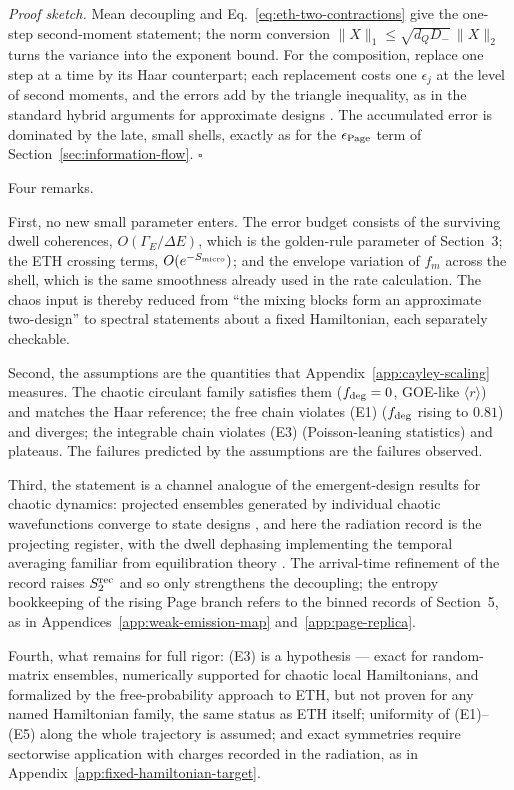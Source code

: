 \documentclass[12pt]{article}
\newcommand{\Smicro}{S_{\rm micro}}
\begin{document}
\emph{Proof sketch.}  Mean decoupling and
Eq.~\eqref{eq:eth-two-contractions} give the one-step second-moment
statement; the norm conversion
$\|X\|_1\le\sqrt{d_QD_-}\,\|X\|_2$ turns the variance into the exponent
bound.  For the composition, replace one step at a time by its Haar
counterpart; each replacement costs one $\epsilon_j$ at the level of second
moments, and the errors add by the triangle inequality, as in the standard
hybrid arguments for approximate designs
\cite{SzehrDupuisTomamichelRenner2013,HarrowLow2009}.  The accumulated error
is dominated by the late, small shells, exactly as for the
$\epsilon_{\rm Page}$ term of Section~\ref{sec:information-flow}.
\hfill$\square$

Four remarks.

First, no new small parameter enters.  The error budget consists of the
surviving dwell coherences, $O(\Gamma_E/\Delta E)$, which is the golden-rule
parameter of Section~3; the ETH crossing terms, $O(e^{-\Smicro})$; and the
envelope variation of $f_m$ across the shell, which is the same smoothness
already used in the rate calculation.  The chaos input is thereby reduced
from ``the mixing blocks form an approximate two-design'' to spectral
statements about a fixed Hamiltonian, each separately checkable.

Second, the assumptions are the quantities that
Appendix~\ref{app:cayley-scaling} measures.  The chaotic circulant family
satisfies them ($f_{\rm deg}=0$, GOE-like $\langle r\rangle$) and matches the
Haar reference; the free chain violates (E1) ($f_{\rm deg}$ rising to
$0.81$) and diverges; the integrable chain violates (E3) (Poisson-leaning
statistics) and plateaus.  The failures predicted by the assumptions are the
failures observed.

Third, the statement is a channel analogue of the emergent-design results
for chaotic dynamics: projected ensembles generated by individual chaotic
wavefunctions converge to state designs
\cite{HoChoi2022,CotlerMarkHuang2023}, and here the radiation record is the
projecting register, with the dwell dephasing implementing the temporal
averaging familiar from equilibration theory
\cite{LindenPopescuShortWinter2009}.  The arrival-time refinement of the
record raises $S_2^{\rm rec}$ and so only strengthens the decoupling; the
entropy bookkeeping of the rising Page branch refers to the binned records of
Section~5, as in Appendices~\ref{app:weak-emission-map}
and~\ref{app:page-replica}.

Fourth, what remains for full rigor: (E3) is a hypothesis --- exact for
random-matrix ensembles, numerically supported for chaotic local
Hamiltonians, and formalized by the free-probability approach to ETH, but
not proven for any named Hamiltonian family, the same status as ETH itself;
uniformity of (E1)--(E5) along the whole trajectory is assumed; and exact
symmetries require sectorwise application with charges recorded in the
radiation, as in Appendix~\ref{app:fixed-hamiltonian-target}.
\end{document}
